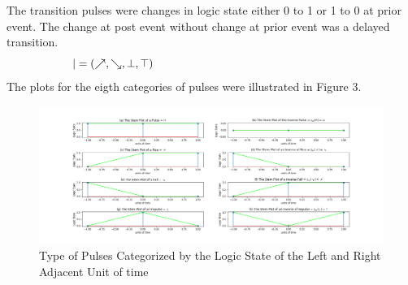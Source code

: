 \documentclass[10pt,journal]{IEEEtran}
\begin{document}
The transition pulses were changes in logic state either 0 to 1 or 1 to 0     at prior event. The change at post event without change at prior event was     a delayed transition.
\begin{equation}
 \begin{minipage}{250pt}
\begin{flushleft} $\displaystyle | = (\nearrow, \searrow, \bot,\top)$  \end{flushleft}
 \end{minipage}
 \end{equation}
The plots for the eigth categories of pulses were illustrated in Figure 3.
\begin{figure}[H]
\centering\includegraphics[width=1\linewidth,height=0.35\textheight]{FG003.png}
\caption{Type of Pulses Categorized by the Logic State of the Left and Right Adjacent Unit of time}
\label{fig:FG003.png}
\end{figure}
\end{document}
